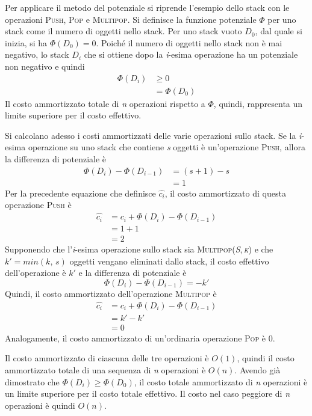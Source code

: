 \documentclass[10pt, a4paper]{report}
\begin{document}
Per applicare il metodo del potenziale si riprende l'esempio dello stack con le operazioni \textsc{Push}, \textsc{Pop} e \textsc{Multipop}. Si definisce la funzione potenziale $\Phi$ per uno stack come il numero di oggetti nello stack. Per uno stack vuoto $D_0$, dal quale si inizia, si ha $\Phi(D_0) = 0$. Poiché il numero di oggetti nello stack non è mai negativo, lo stack $D_i$ che si ottiene dopo la \textit{i}-esima operazione ha un potenziale non negativo e quindi
\begin{align*}
\Phi(D_i) &\geq 0\\
&= \Phi(D_0)
\end{align*}
Il costo ammortizzato totale di \textit{n} operazioni rispetto a $\Phi$, quindi, rappresenta un limite superiore per il costo effettivo.

Si calcolano adesso i costi ammortizzati delle varie operazioni sullo stack. Se la \textit{i}-esima operazione su uno stack che contiene \textit{s} oggetti è un'operazione \textsc{Push}, allora la differenza di potenziale è
\begin{align*}
\Phi(D_i) - \Phi(D_{i-1}) &= (s + 1) - s\\
&= 1
\end{align*}
Per la precedente equazione che definisce $\widehat{c_i}$, il costo ammortizzato di questa operazione \textsc{Push} è
\begin{align*}
\widehat{c_i} &= c_i + \Phi(D_i) - \Phi(D_{i-1})\\
&= 1 + 1\\
&= 2
\end{align*}
Supponendo che l'\textit{i}-esima operazione sullo stack sia \textsc{Multipop(\textit{S},\,\textit{k})} e che $k' = min(k,\,s)$ oggetti vengano eliminati dallo stack, il costo effettivo dell'operazione è $k'$ e la differenza di potenziale è
\begin{equation*}
\Phi(D_i) - \Phi(D_{i-1}) = -k'
\end{equation*}
Quindi, il costo ammortizzato dell'operazione \textsc{Multipop} è
\begin{align*}
\widehat{c_i} &= c_i + \Phi(D_i) - \Phi(D_{i-1})\\
&= k' - k'\\
&= 0
\end{align*}
Analogamente, il costo ammortizzato di un'ordinaria operazione \textsc{Pop} è 0.

Il costo ammortizzato di ciascuna delle tre operazioni è $O(1)$, quindi il costo ammortizzato totale di una sequenza di \textit{n} operazioni è $O(n)$. Avendo già dimostrato che $\Phi(D_i) \geq \Phi(D_0)$, il costo totale ammortizzato di \textit{n} operazioni è un limite superiore per il costo totale effettivo. Il costo nel caso peggiore di \textit{n} operazioni è quindi $O(n)$.
\end{document}
